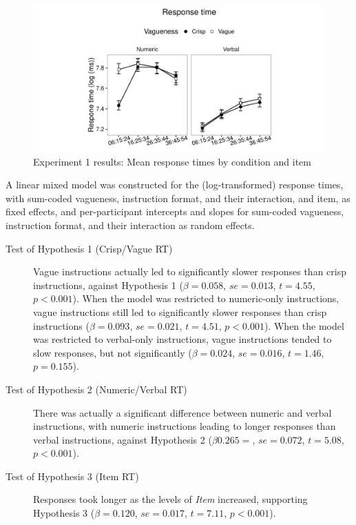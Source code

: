 \documentclass[ %
  graybox       %
 ,envcountchap  %
 ,sectrefs      %
]{svmono}
\begin{document}
\begin{figure}[htbp]
\centering
\includegraphics[width=\textwidth]{figures/Ce1-rtplot-1.pdf}
\caption{Experiment 1 results: Mean response times by condition and item}
\label{resultsC-exp-1-RT}
\end{figure}

A linear mixed model was constructed for the (log-transformed) response times, with sum-coded vagueness, instruction format, and their interaction, and item, as fixed effects, and per-participant intercepts and slopes for sum-coded vagueness, instruction format, and their interaction as random effects.

\begin{description}
	\item [Test of Hypothesis 1 (Crisp/Vague RT)] Vague instructions actually led to significantly slower responses than crisp instructions, against Hypothesis 1 ($\beta=0.058$, $se=0.013$, $t=4.55$, $p<0.001$). When the model was restricted to numeric-only instructions, vague instructions still led to significantly slower responses than crisp instructions ($\beta=0.093$, $se=0.021$, $t=4.51$, $p<0.001$). When the model was restricted to verbal-only instructions, vague instructions tended to slow responses, but not significantly ($\beta=0.024$, $se=0.016$, $t=1.46$, $p=0.155$).
	\item [Test of Hypothesis 2 (Numeric/Verbal RT)] There was actually a significant difference between numeric and verbal instructions, with numeric instructions leading to longer responses than verbal instructions, against Hypothesis 2 ($\beta0.265=$, $se=0.072$, $t=5.08$, $p<0.001$).
	\item [Test of Hypothesis 3 (Item RT)] Responses took longer as the levels of \emph{Item} increased, supporting Hypothesis 3 ($\beta=0.120$, $se=0.017$, $t=7.11$, $p<0.001$).
\end{description}
\end{document}
